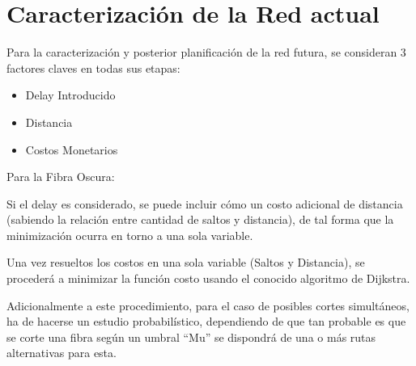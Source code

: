 \section{Caracterizaci\'on de la Red actual}\label{sec:caracterizacion}

Para la caracterización y posterior planificación de la red futura, se consideran 3 factores claves en todas sus etapas:

\begin{itemize}
\item Delay Introducido
\item Distancia
\item Costos Monetarios
\end{itemize}

Para la Fibra Oscura: 

Si el delay es considerado, se puede incluir cómo un costo adicional de distancia (sabiendo la relación entre cantidad de saltos y distancia), de tal forma que la minimización ocurra en torno a una sola variable.

Una vez resueltos los costos en una sola variable (Saltos y Distancia), se procederá a minimizar la función costo usando el conocido algoritmo de Dijkstra. 

Adicionalmente a este procedimiento, para el caso de posibles cortes simultáneos, ha de hacerse un estudio probabilístico, dependiendo de que tan probable es que se corte una fibra según un umbral “Mu” se dispondrá de una o más rutas alternativas para esta. 
